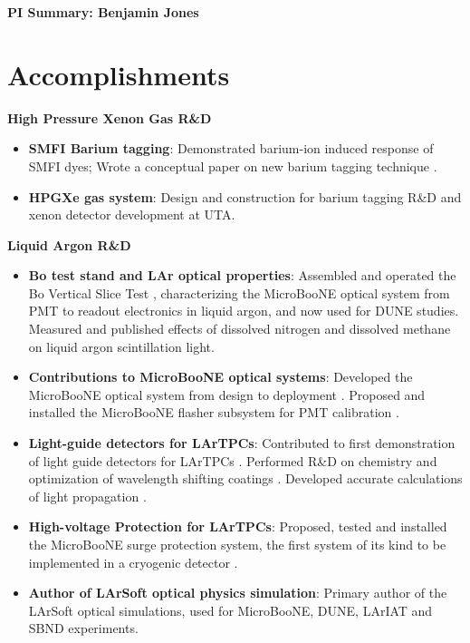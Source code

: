 
\begin{center}
\Large\textbf{PI Summary: Benjamin Jones}
\end{center}


\section*{\textbf{Accomplishments}}

\noindent\textbf{High Pressure Xenon Gas R\&D}

\begin{itemize}[noitemsep,nolistsep]
\item{\textbf{SMFI Barium tagging}}: Demonstrated  barium-ion induced response of SMFI dyes; Wrote a conceptual paper on new barium tagging technique \cite{Jones:2016qiq}.
\item{\textbf{HPGXe gas system}}: Design and construction for barium tagging R\&D and xenon detector development at UTA.

\end{itemize}

\noindent\textbf{Liquid Argon R\&D}
\begin{itemize}[noitemsep,nolistsep]
\item{\textbf{Bo test stand and LAr optical properties}}:  Assembled and operated the Bo Vertical Slice Test \cite{Jones:2013nea}, characterizing the MicroBooNE optical system from PMT to readout electronics in liquid argon, and now  used for DUNE studies.  Measured and published effects of dissolved nitrogen \cite{Jones:2013bca} and dissolved methane \cite{Jones:2013mfa} on liquid argon scintillation light. 
\item{\textbf{Contributions to MicroBooNE optical systems}}: Developed the MicroBooNE optical system from design to deployment \cite{Briese:2013wua}. Proposed and installed the MicroBooNE flasher subsystem for PMT calibration \cite{Conrad:2015xta}.  
\item{\textbf{Light-guide detectors for LArTPCs}}: Contributed to first demonstration of light guide detectors for LArTPCs \cite{Moss:2014ota,Baptista:2012bf}.  Performed R\&D on chemistry and optimization of wavelength shifting coatings \cite{Chiu:2012ju,Jones:2012hm}.  Developed accurate calculations of light propagation \cite{Jones:2013sfa}.
\item{\textbf{High-voltage Protection for LArTPCs}}: Proposed, tested and installed the MicroBooNE surge protection system, the first system of its kind to be implemented in a cryogenic detector \cite{Asaadi:2014iva}.
\item{\textbf{Author of LArSoft optical physics simulation}}:  Primary author of the LArSoft optical simulations, used for MicroBooNE, DUNE, LArIAT and SBND experiments.

\end{itemize}


